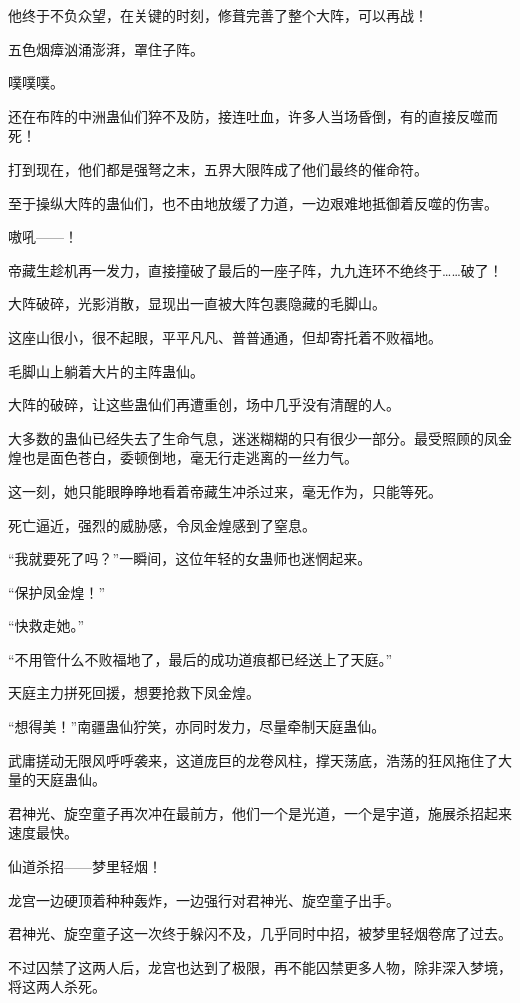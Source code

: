 \begin{this_body}
他终于不负众望，在关键的时刻，修葺完善了整个大阵，可以再战！

五色烟瘴汹涌澎湃，罩住子阵。

噗噗噗。

还在布阵的中洲蛊仙们猝不及防，接连吐血，许多人当场昏倒，有的直接反噬而死！

打到现在，他们都是强弩之末，五界大限阵成了他们最终的催命符。

至于操纵大阵的蛊仙们，也不由地放缓了力道，一边艰难地抵御着反噬的伤害。

嗷吼——！

帝藏生趁机再一发力，直接撞破了最后的一座子阵，九九连环不绝终于……破了！

大阵破碎，光影消散，显现出一直被大阵包裹隐藏的毛脚山。

这座山很小，很不起眼，平平凡凡、普普通通，但却寄托着不败福地。

毛脚山上躺着大片的主阵蛊仙。

大阵的破碎，让这些蛊仙们再遭重创，场中几乎没有清醒的人。

大多数的蛊仙已经失去了生命气息，迷迷糊糊的只有很少一部分。最受照顾的凤金煌也是面色苍白，委顿倒地，毫无行走逃离的一丝力气。

这一刻，她只能眼睁睁地看着帝藏生冲杀过来，毫无作为，只能等死。

死亡逼近，强烈的威胁感，令凤金煌感到了窒息。

“我就要死了吗？”一瞬间，这位年轻的女蛊师也迷惘起来。

“保护凤金煌！”

“快救走她。”

“不用管什么不败福地了，最后的成功道痕都已经送上了天庭。”

天庭主力拼死回援，想要抢救下凤金煌。

“想得美！”南疆蛊仙狞笑，亦同时发力，尽量牵制天庭蛊仙。

武庸搓动无限风呼呼袭来，这道庞巨的龙卷风柱，撑天荡底，浩荡的狂风拖住了大量的天庭蛊仙。

君神光、旋空童子再次冲在最前方，他们一个是光道，一个是宇道，施展杀招起来速度最快。

仙道杀招——梦里轻烟！

龙宫一边硬顶着种种轰炸，一边强行对君神光、旋空童子出手。

君神光、旋空童子这一次终于躲闪不及，几乎同时中招，被梦里轻烟卷席了过去。

不过囚禁了这两人后，龙宫也达到了极限，再不能囚禁更多人物，除非深入梦境，将这两人杀死。


\end{this_body}
